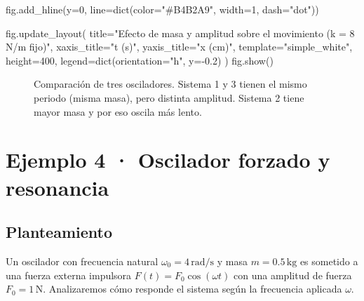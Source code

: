 \documentclass[
  letterpaper,
  DIV=11,
  numbers=noendperiod]{scrreprt}
\newenvironment{Shaded}{\begin{snugshade}}{\end{snugshade}}
\newcommand{\BuiltInTok}[1]{\textcolor[rgb]{0.00,0.23,0.31}{#1}}
\newcommand{\DecValTok}[1]{\textcolor[rgb]{0.68,0.00,0.00}{#1}}
\newcommand{\FloatTok}[1]{\textcolor[rgb]{0.68,0.00,0.00}{#1}}
\newcommand{\NormalTok}[1]{\textcolor[rgb]{0.00,0.23,0.31}{#1}}
\newcommand{\OperatorTok}[1]{\textcolor[rgb]{0.37,0.37,0.37}{#1}}
\newcommand{\StringTok}[1]{\textcolor[rgb]{0.13,0.47,0.30}{#1}}
\begin{document}
\begin{Shaded}
\begin{Highlighting}[]
\NormalTok{fig.add\_hline(y}\OperatorTok{=}\DecValTok{0}\NormalTok{, line}\OperatorTok{=}\BuiltInTok{dict}\NormalTok{(color}\OperatorTok{=}\StringTok{"\#B4B2A9"}\NormalTok{, width}\OperatorTok{=}\DecValTok{1}\NormalTok{, dash}\OperatorTok{=}\StringTok{"dot"}\NormalTok{))}

\NormalTok{fig.update\_layout(}
\NormalTok{    title}\OperatorTok{=}\StringTok{"Efecto de masa y amplitud sobre el movimiento (k = 8 N/m fijo)"}\NormalTok{,}
\NormalTok{    xaxis\_title}\OperatorTok{=}\StringTok{"t (s)"}\NormalTok{,}
\NormalTok{    yaxis\_title}\OperatorTok{=}\StringTok{"x (cm)"}\NormalTok{,}
\NormalTok{    template}\OperatorTok{=}\StringTok{"simple\_white"}\NormalTok{,}
\NormalTok{    height}\OperatorTok{=}\DecValTok{400}\NormalTok{,}
\NormalTok{    legend}\OperatorTok{=}\BuiltInTok{dict}\NormalTok{(orientation}\OperatorTok{=}\StringTok{"h"}\NormalTok{, y}\OperatorTok{={-}}\FloatTok{0.2}\NormalTok{)}
\NormalTok{)}
\NormalTok{fig.show()}
\end{Highlighting}
\end{Shaded}

\begin{figure}


\caption{\label{fig-osc-3}Comparación de tres osciladores. Sistema 1 y 3
tienen el mismo periodo (misma masa), pero distinta amplitud. Sistema 2
tiene mayor masa y por eso oscila más lento.}

\end{figure}%

\section{Ejemplo 4 · Oscilador forzado y resonancia}\label{sec-osc-4}

\subsection{Planteamiento}\label{planteamiento-3}

Un oscilador con frecuencia natural \(\omega_0 = 4\,\text{rad/s}\) y
masa \(m = 0.5\,\text{kg}\) es sometido a una fuerza externa impulsora
\(F(t) = F_0 \cos(\omega t)\) con una amplitud de fuerza
\(F_0 = 1\,\text{N}\). Analizaremos cómo responde el sistema según la
frecuencia aplicada \(\omega\).
\end{document}
